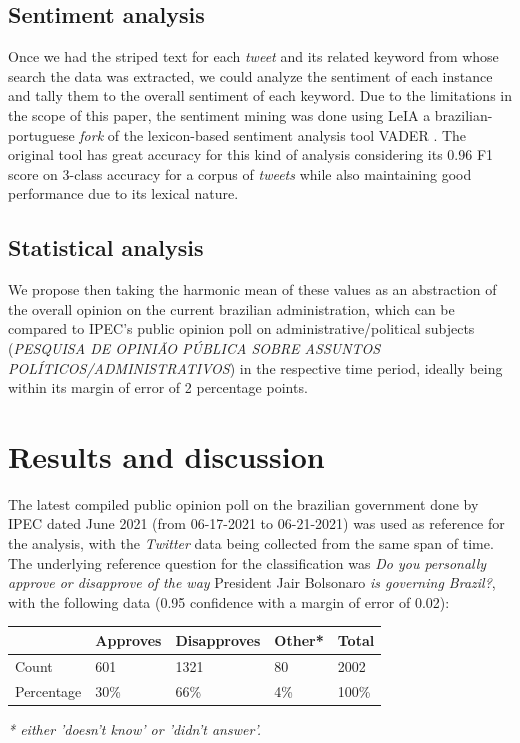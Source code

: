 \documentclass[conference]{IEEEtran}
\begin{document}
\subsection{Sentiment analysis}
\label{sec:orgd5f4002}
Once we had the striped text for each \emph{tweet} and its related keyword from whose search the data was extracted, we could analyze the sentiment of each instance and tally them to the overall sentiment of each keyword. Due to the limitations in the scope of this paper, the sentiment mining was done using LeIA \cite{Almeida2018} a brazilian-portuguese \emph{fork} of the lexicon-based sentiment analysis tool VADER \cite{Hutto2014}. The original tool has great accuracy for this kind of analysis considering its 0.96 F1 score on 3-class accuracy for a corpus of \emph{tweets} while also maintaining good performance due to its lexical nature.
\subsection{Statistical analysis}
\label{sec:org35660bc}
We propose then taking the harmonic mean of these values as an abstraction of the overall opinion on the current brazilian administration, which can be compared to IPEC's public opinion poll on administrative/political subjects (\emph{PESQUISA DE OPINIÃO PÚBLICA SOBRE ASSUNTOS POLÍTICOS/ADMINISTRATIVOS}) \cite{IpecPesquisas} in the respective time period, ideally being within its margin of error of 2 percentage points.

\section{Results and discussion}
\label{sec:org158dce7}
The latest compiled public opinion poll on the brazilian government done by IPEC dated June 2021 (from 06-17-2021 to 06-21-2021) \cite{AvaliacaoGovernoIPEC} was used as reference for the analysis, with the \emph{Twitter} data being collected from the same span of time. The underlying reference question for the classification was \emph{Do you personally approve or disapprove of the way} President Jair Bolsonaro \emph{is governing Brazil?}, with the following data (0.95 confidence with a margin of error of 0.02):

\begin{center}
\begin{tabular}{lllll}
 & Approves & Disapproves & Other* & Total\\
\hline
Count & 601 & 1321 & 80 & 2002\\
Percentage & 30\% & 66\% & 4\% & 100\%\\
\end{tabular}
\end{center}
\emph{* either 'doesn't know' or 'didn't answer'.}
\end{document}
